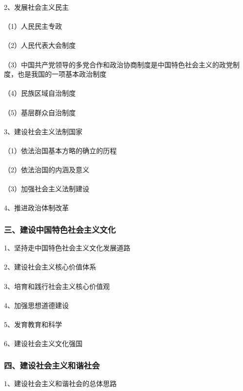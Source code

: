 \documentclass{ctexart}
\begin{document}
2、发展社会主义民主
\\\\
（1）人民民主专政
\\\\
（2）人民代表大会制度
\\\\
（3）中国共产党领导的多党合作和政治协商制度是中国特色社会主义的政党制度，也是我国的一项基本政治制度
\\\\
（4）民族区域自治制度
\\\\
（5）基层群众自治制度
\\\\

3、建设社会主义法制国家
\\\\
（1）依法治国基本方略的确立的历程
\\\\
（2）依法治国的内涵及意义
\\\\
（3）加强社会主义法制建设
\\\\

4、推进政治体制改革

\subsubsection{三、建设中国特色社会主义文化}
1、坚持走中国特色社会主义文化发展道路
\\\\

2、建设社会主义核心价值体系
\\\\

3、培育和践行社会主义核心价值观
\\\\

4、加强思想道德建设
\\\\

5、发育教育和科学
\\\\

6、建设社会主义文化强国

\subsubsection{四、建设社会主义和谐社会}
1、建设社会主义和谐社会的总体思路
\\\\
\end{document}
